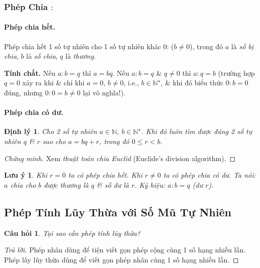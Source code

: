 \documentclass{article}
\numberwithin{equation}{section}
\newtheorem{theorem}{Định lý}[section]
\newtheorem{remark}{Lưu ý}[section]
\newtheorem{question}{Câu hỏi}[section]
\begin{document}
\subsubsection{Phép Chia $:$}

\paragraph{Phép chia hết.} Phép chia hết 1 số tự nhiên cho 1 số tự nhiên khác 0:  ($b\ne 0$), trong đó $a$ là \textit{số bị chia}, $b$ là \textit{số chia}, $q$ là \textit{thương}.

\noindent\textbf{Tính chất.} Nếu $a:b = q$ thì $a = bq$. Nếu $a:b = q$ \& $q\ne 0$ thì $a:q = b$ (trường hợp $q = 0$ xảy ra khi \& chỉ khi $a = 0$, $b\ne 0$, i.e., $b\in\mathbb{N}^\star$, \& khi đó biểu thức $0:b = 0$ đúng, nhưng $0:0 = b\ne 0$ lại vô nghĩa!).

\paragraph{Phép chia có dư.}
\begin{theorem}
	Cho 2 số tự nhiên $a\in\mathbb{N}$, $b\in\mathbb{N}^\star$. Khi đó luôn tìm được đúng 2 số tự nhiên $q$ \& $r$ sao cho $a = bq + r$, trong đó $0\le r < b$.
\end{theorem}

\begin{proof}[Chứng minh]
	Xem \textit{thuật toán chia Euclid} (Euclide's division algorithm).
\end{proof}

\begin{remark}
	Khi $r = 0$ ta có phép chia hết. Khi $r\ne 0$ ta có phép chia có dư. Ta nói: $a$ chia cho $b$ được thương là $q$ \& số dư là $r$. Ký hiệu: $a:b = q$ (dư $r$).
\end{remark}

\subsection{Phép Tính Lũy Thừa với Số Mũ Tự Nhiên}

\begin{question}
	Tại sao cần phép tính lũy thừa?
\end{question}

\begin{proof}[Trả lời]
	Phép nhân dùng để tiện viết gọn phép cộng cùng 1 số hạng nhiều lần. Phép lấy lũy thừa dùng để viết gọn phép nhân cùng 1 số hạng nhiều lần.
\end{proof}
\end{document}
